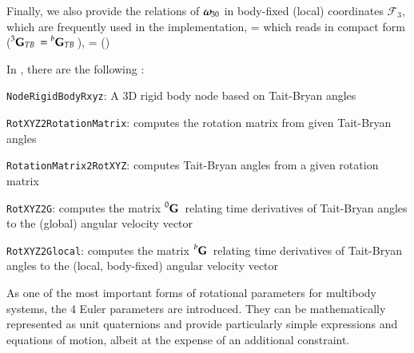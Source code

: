 \noindent Finally, we also provide the relations of $\mbox{\boldmath $\omega$ \unboldmath}\!\!_{30}$ in body-fixed (local) coordinates $\mathcal{F}_3$,
which are frequently used in the implementation,
\be
   =  \vr{\dot{\alpha}}{\dot{\beta}}{\dot{\gamma}} \eqComma
\ee
which reads in compact form ($\prescript{3}{}{\mathbf{G}}_{TB}\, = \prescript{b}{}{\mathbf{G}}_{TB}\,$),
\be
   =  (\tbeta) \dot{\tbeta}
\ee

\noindent In \codeName, there are the following :
\bi
  \item \texttt{NodeRigidBodyRxyz}: A 3D rigid body node based on Tait-Bryan angles
  \item \texttt{RotXYZ2RotationMatrix}: computes the rotation matrix from given Tait-Bryan angles
  \item \texttt{RotationMatrix2RotXYZ}: computes Tait-Bryan angles from a given rotation matrix
  \item \texttt{RotXYZ2G}: computes the matrix $\prescript{0}{}{\mathbf{G}}\,$ relating time derivatives of Tait-Bryan angles to the (global) angular velocity vector
  \item \texttt{RotXYZ2Glocal}: computes the matrix $\prescript{b}{}{\mathbf{G}}\,$ relating time derivatives of Tait-Bryan angles to the (local, body-fixed) angular velocity vector
\ei




As one of the most important forms of rotational parameters for multibody systems, the 4 Euler parameters are introduced.
They can be mathematically represented as unit quaternions and provide particularly simple expressions and equations of motion, albeit at the expense of an additional constraint.

